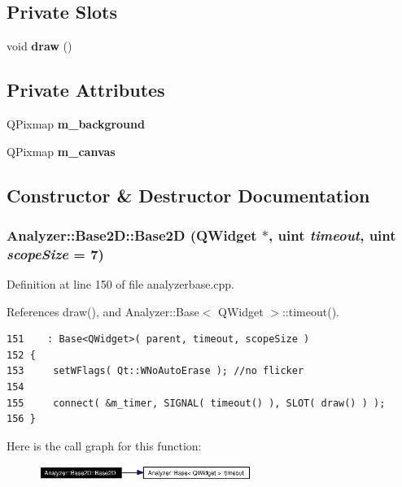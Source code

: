 \subsection*{Private Slots}
\begin{CompactItemize}
\item 
void {\bf draw} ()
\end{CompactItemize}
\subsection*{Private Attributes}
\begin{CompactItemize}
\item 
QPixmap {\bf m\_\-background}
\item 
QPixmap {\bf m\_\-canvas}
\end{CompactItemize}


\subsection{Constructor \& Destructor Documentation}
\subsubsection{\setlength{\rightskip}{0pt plus 5cm}Analyzer::Base2D::Base2D ({\bf QWidget} $\ast$, uint {\em timeout}, uint {\em scope\-Size} = 7)\hspace{0.3cm}{\tt  [protected]}}\label{classAnalyzer_1_1Base2D_Analyzer_1_1Base2Db0}




Definition at line 150 of file analyzerbase.cpp.

References draw(), and Analyzer::Base$<$ QWidget $>$::timeout().



\footnotesize\begin{verbatim}151    : Base<QWidget>( parent, timeout, scopeSize )
152 {
153     setWFlags( Qt::WNoAutoErase ); //no flicker
154 
155     connect( &m_timer, SIGNAL( timeout() ), SLOT( draw() ) );
156 }
\end{verbatim}\normalsize 


Here is the call graph for this function:\begin{figure}[H]
\begin{center}
\leavevmode
\includegraphics[width=196pt]{classAnalyzer_1_1Base2D_Analyzer_1_1Base2Db0_cgraph}
\end{center}
\end{figure}


